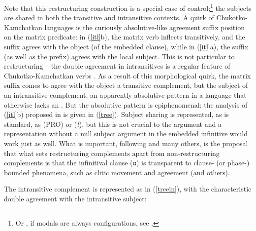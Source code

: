 \documentclass[output=paper]{langsci/langscibook}
\begin{document}
Note that this restructuring construction is a special case of
control;\footnote{Or , if modals are always  configurations, see
\cite{wurmbrand99}.} the subjects are shared in both the transitive and
intransitive contexts. A quirk of Chu\-kotko-Kamchatkan languages is the
curiously absolutive-like agreement suffix position on the matrix predicate: in
(\ref{itl}b), the matrix verb inflects transitively, and the suffix agrees with
the object (of the embedded clause), while in (\ref{itl}a), the suffix (as well
as the prefix) agrees with the local subject. This is not particular to
restructuring -- the double agreement in intransitives is a regular feature of
Chukotko-Kamchatkan verbs \citep{bobaljik98}. As a result of this morphological
quirk, the matrix suffix comes to agree with the object a transitive
complement, but the subject of an intransitive complement, an apparently
absolutive pattern in a language that otherwise lacks an .
But the absolutive pattern is epiphenomenal: the analysis of (\ref{itl}b)
proposed in \cite{BobWur2005} is given in (\ref{tree}). Subject sharing is
represented, as is standard, as  (PRO) or  (\emph{t}), but this
is not crucial to the argument and a representation without a null
subject
argument in the embedded infinitive would work just as well. What is important,
following \cite{Wurmbrand2001,wurmbrand15} and many others, is the proposal that
what sets restructuring complements apart from non-restructuring complements is
that the infinitival clause (α) is transparent to clause- (or phase-)
bounded phenomena, such as clitic movement and agreement (and others).

\ea \label{tree}
\z

The intransitive complement is represented as in (\ref{treein}), with the
characteristic double agreement with the intransitive subject:
\end{document}
